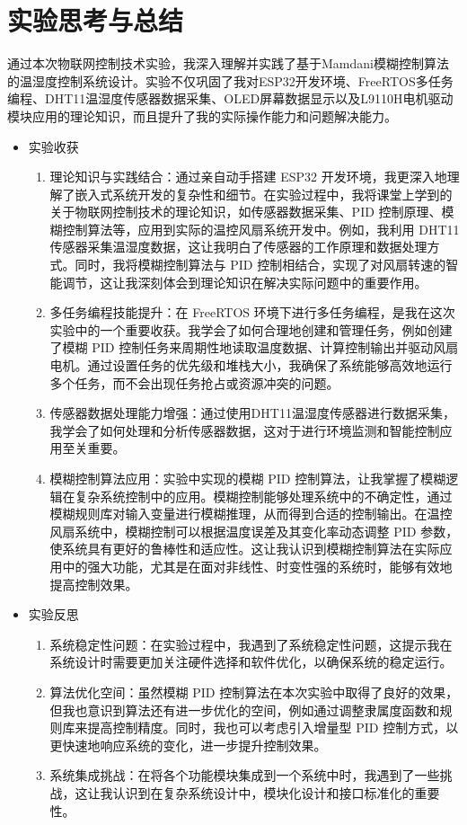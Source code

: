 \documentclass[UTF8]{ctexart}
\begin{document}
\section{实验思考与总结}
通过本次物联网控制技术实验，我深入理解并实践了基于Mamdani模糊控制算法的温湿度控制系统设计。实验不仅巩固了我对ESP32开发环境、FreeRTOS多任务编程、DHT11温湿度传感器数据采集、OLED屏幕数据显示以及L9110H电机驱动模块应用的理论知识，而且提升了我的实际操作能力和问题解决能力。
\begin{itemize}
	\item 实验收获
	\begin{enumerate}
		\item 理论知识与实践结合：通过亲自动手搭建 ESP32 开发环境，我更深入地理解了嵌入式系统开发的复杂性和细节。在实验过程中，我将课堂上学到的关于物联网控制技术的理论知识，如传感器数据采集、PID 控制原理、模糊控制算法等，应用到实际的温控风扇系统开发中。例如，我利用 DHT11 传感器采集温湿度数据，这让我明白了传感器的工作原理和数据处理方式。同时，我将模糊控制算法与 PID 控制相结合，实现了对风扇转速的智能调节，这让我深刻体会到理论知识在解决实际问题中的重要作用。
		\item 多任务编程技能提升：在 FreeRTOS 环境下进行多任务编程，是我在这次实验中的一个重要收获。我学会了如何合理地创建和管理任务，例如创建了模糊 PID 控制任务来周期性地读取温度数据、计算控制输出并驱动风扇电机。通过设置任务的优先级和堆栈大小，我确保了系统能够高效地运行多个任务，而不会出现任务抢占或资源冲突的问题。
		\item 传感器数据处理能力增强：通过使用DHT11温湿度传感器进行数据采集，我学会了如何处理和分析传感器数据，这对于进行环境监测和智能控制应用至关重要。
		\item 模糊控制算法应用：实验中实现的模糊 PID 控制算法，让我掌握了模糊逻辑在复杂系统控制中的应用。模糊控制能够处理系统中的不确定性，通过模糊规则库对输入变量进行模糊推理，从而得到合适的控制输出。在温控风扇系统中，模糊控制可以根据温度误差及其变化率动态调整 PID 参数，使系统具有更好的鲁棒性和适应性。这让我认识到模糊控制算法在实际应用中的强大功能，尤其是在面对非线性、时变性强的系统时，能够有效地提高控制效果。
	\end{enumerate}
	\item 实验反思
	\begin{enumerate}
		\item 系统稳定性问题：在实验过程中，我遇到了系统稳定性问题，这提示我在系统设计时需要更加关注硬件选择和软件优化，以确保系统的稳定运行。
		\item 算法优化空间：虽然模糊 PID 控制算法在本次实验中取得了良好的效果，但我也意识到算法还有进一步优化的空间，例如通过调整隶属度函数和规则库来提高控制精度。同时，我也可以考虑引入增量型 PID 控制方式，以更快速地响应系统的变化，进一步提升控制效果。
		\item 系统集成挑战：在将各个功能模块集成到一个系统中时，我遇到了一些挑战，这让我认识到在复杂系统设计中，模块化设计和接口标准化的重要性。
	\end{enumerate}
\end{itemize}
\end{document}
